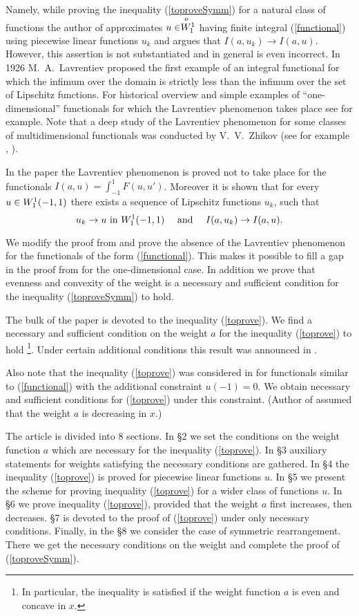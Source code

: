 Namely, while proving the inequality (\ref{toproveSymm}) for a natural class of functions
the author of \cite{Br} approximates $u \in \stackrel{o\ }{W_1^1}$ having finite integral (\ref{functional})
using piecewise linear functions $u_k$ and argues that $I(a, u_k) \to I(a, u)$.
However, this assertion is not substantiated and in general is even incorrect.
In 1926 M.~A.~Lavrentiev proposed the first example of an integral functional
for which the infimum over the domain is strictly less than the infimum over the set of Lipschitz functions.
For historical overview and simple examples of ``one-dimensional'' functionals
for which the Lavrentiev phenomenon takes place see \cite{BGH} for example.
Note that a deep study of the Lavrentiev phenomenon for some classes of multidimensional functionals
was conducted by V.~V.~Zhikov (see for example \cite{Zh1}, \cite{Zh2}).

In the paper \cite{ASC} the Lavrentiev phenomenon is proved not to take place for the functionals
$I(a, u) = \int_{-1}^1 F(u, u')$.
Moreover it is shown that for every $u \in W_1^1(-1, 1)$ there exists a sequence
of Lipschitz functions $u_k$, such that
\begin{equation}
\label{convergence}
u_k \to u \text{ in } \W (-1, 1) \quad \text{ and } \quad I (a, u_k) \to I (a, u).
\end{equation}

We modify the proof from \cite{ASC} and prove the absence of the Lavrentiev phenomenon
for the functionals of the form (\ref{functional}).
This makes it possible to fill a gap in the proof from \cite{Br} for the one-dimensional case.
In addition we prove that evenness and convexity of the weight is a necessary and sufficient condition
for the inequality (\ref{toproveSymm}) to hold.

The bulk of the paper is devoted to the inequality (\ref{toprove}).
We find a necessary and sufficient condition on the weight $a$ for the inequality (\ref{toprove}) to hold%
\footnote{In particular, the inequality is satisfied if the weight function $a$ is even and concave in $x$.}.
Under certain additional conditions this result was announced in \cite{DAN}.

Also note that the inequality (\ref{toprove}) was considered in \cite{Lan}
for functionals similar to (\ref{functional}) with the additional constraint $u(-1) = 0$.
We obtain necessary and sufficient conditions for (\ref{toprove}) under this constraint.
(Author of \cite{Lan} assumed that the weight $a$ is decreasing in $x$.)

The article is divided into 8 sections.
In \S2 we set the conditions on the weight function $a$ which are necessary for the inequality (\ref{toprove}).
In \S3 auxiliary statements for weights satisfying the necessary conditions are gathered.
In \S4 the inequality (\ref{toprove}) is proved for piecewise linear functions $u$.
In \S5 we present the scheme for proving inequality (\ref{toprove}) for a wider class of functions $u$.
In \S6 we prove inequality (\ref{toprove}), provided that the weight $a$ first increases, then decreases.
\S7 is devoted to the proof of (\ref{toprove}) under only necessary conditions.
Finally, in the \S8 we consider the case of symmetric rearrangement.
There we get the necessary conditions on the weight and complete the proof of (\ref{toproveSymm}).
